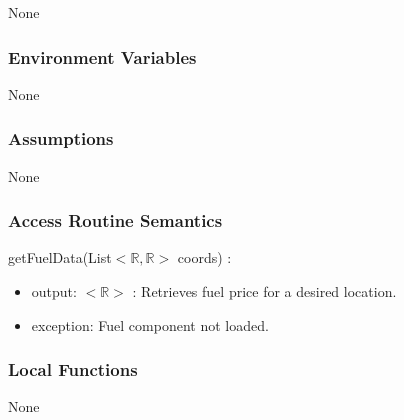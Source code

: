 \documentclass[12pt, titlepage]{article}
\begin{document}
None

\subsubsection{Environment Variables}

None

\subsubsection{Assumptions}

None

\subsubsection{Access Routine Semantics}

\noindent getFuelData(List$<\mathbb{R},\mathbb{R}>$ coords) :
\begin{itemize}
\item output: $<\mathbb{R}>$ : Retrieves fuel price for a desired location.
\item exception: Fuel component not loaded.
\end{itemize}

\subsubsection{Local Functions}

None

\newpage

\end{document}
